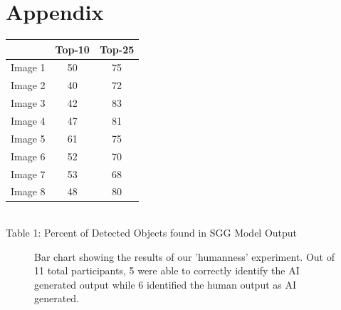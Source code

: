 \documentclass[letterpaper, 10 pt, conference]{ieeeconf}  %
\begin{document}
\section{Appendix}
\vspace*{3mm}
\centering
    \begin{tabular}{|c|c|c|}
        \hline
         & Top-10 & Top-25 \\
        \hline
        Image 1 & 50 & 75\\
        Image 2 & 40 & 72\\
        Image 3 & 42 & 83\\
        Image 4 & 47 & 81\\
        Image 5 & 61 & 75\\
        Image 6 & 52 & 70\\
        Image 7 & 53 & 68\\
        Image 8 & 48 & 80\\
        \hline

    \end{tabular}
    \\
    \vspace*{3mm}
    {Table 1: Percent of Detected Objects found in SGG Model Output}
    \begin{figure}[h]
        \centering
        \caption{Bar chart showing the results of our 'humanness' experiment. Out of 11 total participants, 5 were able to correctly identify the AI generated output while 6 identified the human output as AI generated.}
      \end{figure}
    



\end{document}
